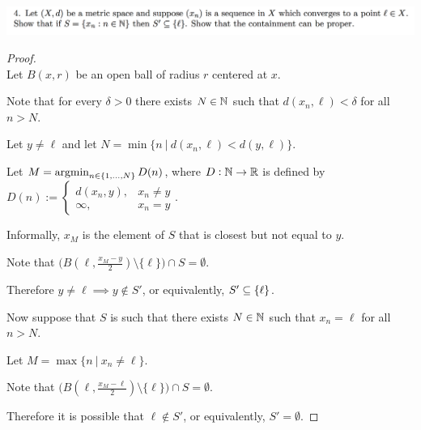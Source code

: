 \documentclass[12pt]{article}
\begin{document}

\newpage
\subsection{}
\begin{mdframed}
\includegraphics[width=400pt]{img/oxford-a2-1-4.png}
\end{mdframed}

\begin{proof}~\\
  Let $B(x, r)$ be an open ball of radius $r$ centered at $x$.

  Note that for every $\delta > 0$ there exists $N \in \mathbb{N}$ such that $d(x_n, \ell) < \delta$ for all
  $n > N$.

  Let $y \neq \ell$ and let $N = \min\{n ~|~ d(x_n, \ell) < d(y, \ell)\}$.

  Let $M = \operatorname*{argmin}_{n \in \{1, \ldots, N\}} D(n)$, where $D:\mathbb{N} \to \mathbb{R}$ is defined by
  $D(n) :=
  \begin{cases}
    d(x_n, y), &x_n \neq y\\
    \infty, &x_n = y
  \end{cases}$.

  Informally, $x_M$ is the element of $S$ that is closest but not equal to $y$.

  Note that $\Big(B(\ell, \frac{x_M - y}{2})\setminus\{\ell\}\Big) \cap S = \emptyset$.

  Therefore $y \neq \ell \implies y \notin S'$, or equivalently, $S' \subseteq \{\ell\}$.

  Now suppose that $S$ is such that there exists $N \in \mathbb{N}$ such that $x_n = \ell$ for all $n > N$.

  Let $M = \max\{n ~|~ x_n \neq \ell\}$.

  Note that $\Big(B(\ell, \frac{x_M - \ell}{2})\setminus\{\ell\}\Big) \cap S = \emptyset$.

  Therefore it is possible that $\ell \notin S'$, or equivalently, $S' = \emptyset$.
\end{proof}
\end{document}
